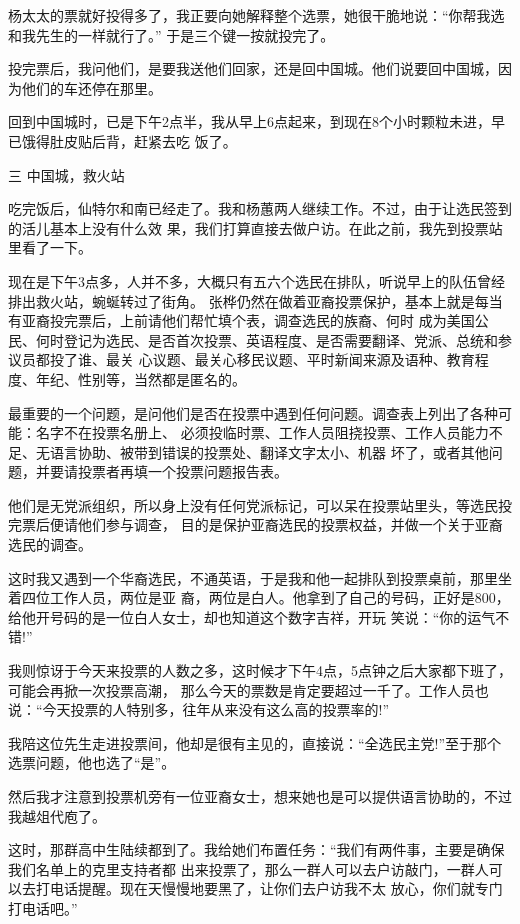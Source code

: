 ﻿\documentclass[11pt]{article}
\begin{document}
杨太太的票就好投得多了，我正要向她解释整个选票，她很干脆地说：``你帮我选和我先生的一样就行了。''
于是三个键一按就投完了。

投完票后，我问他们，是要我送他们回家，还是回中国城。他们说要回中国城，因为他们的车还停在那里。

回到中国城时，已是下午2点半，我从早上6点起来，到现在8个小时颗粒未进，早已饿得肚皮贴后背，赶紧去吃
饭了。

三 中国城，救火站

吃完饭后，仙特尔和南已经走了。我和杨蕙两人继续工作。不过，由于让选民签到的活儿基本上没有什么效
果，我们打算直接去做户访。在此之前，我先到投票站里看了一下。

现在是下午3点多，人并不多，大概只有五六个选民在排队，听说早上的队伍曾经排出救火站，蜿蜒转过了街角。
张桦仍然在做着亚裔投票保护，基本上就是每当有亚裔投完票后，上前请他们帮忙填个表，调查选民的族裔、何时
成为美国公民、何时登记为选民、是否首次投票、英语程度、是否需要翻译、党派、总统和参议员都投了谁、最关
心议题、最关心移民议题、平时新闻来源及语种、教育程度、年纪、性别等，当然都是匿名的。

最重要的一个问题，是问他们是否在投票中遇到任何问题。调查表上列出了各种可能：名字不在投票名册上、
必须投临时票、工作人员阻挠投票、工作人员能力不足、无语言协助、被带到错误的投票处、翻译文字太小、机器
坏了，或者其他问题，并要请投票者再填一个投票问题报告表。

他们是无党派组织，所以身上没有任何党派标记，可以呆在投票站里头，等选民投完票后便请他们参与调查，
目的是保护亚裔选民的投票权益，并做一个关于亚裔选民的调查。

这时我又遇到一个华裔选民，不通英语，于是我和他一起排队到投票桌前，那里坐着四位工作人员，两位是亚
裔，两位是白人。他拿到了自己的号码，正好是800，给他开号码的是一位白人女士，却也知道这个数字吉祥，开玩
笑说：``你的运气不错!''

我则惊讶于今天来投票的人数之多，这时候才下午4点，5点钟之后大家都下班了，可能会再掀一次投票高潮，
那么今天的票数是肯定要超过一千了。工作人员也说：``今天投票的人特别多，往年从来没有这么高的投票率的!''

我陪这位先生走进投票间，他却是很有主见的，直接说：``全选民主党!''至于那个选票问题，他也选了``是''。

然后我才注意到投票机旁有一位亚裔女士，想来她也是可以提供语言协助的，不过我越俎代庖了。

这时，那群高中生陆续都到了。我给她们布置任务：``我们有两件事，主要是确保我们名单上的克里支持者都
出来投票了，那么一群人可以去户访敲门，一群人可以去打电话提醒。现在天慢慢地要黑了，让你们去户访我不太
放心，你们就专门打电话吧。''
\end{document}
